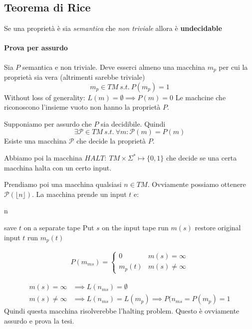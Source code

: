 \documentclass{article}
\newcommand{\floor}[1]{\ensuremath{\lfloor #1 \rfloor}}
\begin{document}
\subsection{Teorema di Rice}
Se una proprietà è sia \textit{semantica} che \textit{non triviale} allora è \textbf{undecidable}

\paragraph{Prova per assurdo}
Sia $P$ semantica e non triviale. Deve esserci almeno una macchina $m_p$ per cui la proprietà sia vera (altrimenti sarebbe triviale)
\begin{equation*}
    m_p\in TM\ s.t.\ P(m_p)=1
\end{equation*}
Without loss of generality: $L(m)=\emptyset\implies P(m)=0$ Le machcine che riconoscono l'insieme vuoto non hanno la proprietà $P$.

Supponiamo per assurdo che $P$ sia decidibile. Quindi
\begin{equation*}
    \exists \mathcal{P} \in TM\ s.t.\ \forall m: \mathcal{P}(m)=P(m)
\end{equation*}
Esiste una macchina $\mathcal{P}$ che decide la proprietà $P$.

Abbiamo poi la macchina $HALT:\ TM\times\Sigma^*\mapsto \{0,1\}$ che decide se una certa macchina halta con un certo input.

Prendiamo poi una macchina qualsiasi $n\in TM$. Ovviamente possiamo ottenere $\mathcal P(\floor{n})$.
La macchina prende un input $t$ e:
\begin{algorithm}
    \caption{n}
    save $t$ on a separate tape\;
    Put $s$ on the input tape\;
    run $m(s)$\;
    restore original input $t$\;
    run $m_p(t)$
\end{algorithm}

\begin{align*}
    P(m_{ms}) = \begin{cases}
        0 & m(s)=\infty \\
        m_p(t) & m(s)\neq\infty
    \end{cases}
\end{align*}

\begin{align*}
    m(s)=\infty &\implies L(n_{ms})=\emptyset \\
    m(s)\neq\infty &\implies L(n_{ms})=L(m_p)\implies P(n_{ms}=P(m_p) = 1
\end{align*}
Quindi questa macchina risolverebbe l'halting problem. Questo è ovviamente assurdo e prova la tesi.
\end{document}
